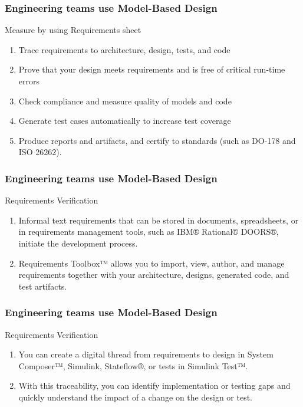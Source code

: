 \newpage 

\begin{frame}
\frametitle{Engineering teams use Model-Based Design }
\begin{block}{ Measure by using Requirements sheet}

\begin{enumerate}
    \item Trace requirements to architecture, design, tests, and code
    \item  Prove that your design meets requirements and is free of critical run-time errors
    \item Check compliance and measure quality of models and code
    \item Generate test cases automatically to increase test coverage
    \item  Produce reports and artifacts, and certify to standards (such as DO-178 and ISO 26262).
\end{enumerate}

\end{block}
\end{frame}


\newpage 

\begin{frame}
\frametitle{Engineering teams use Model-Based Design }
\begin{block}{ Requirements Verification}
\begin{enumerate}
    \item Informal text requirements that can be stored in documents, spreadsheets, or in requirements management tools, such as IBM® Rational® DOORS®, initiate the development process. 
\item  Requirements Toolbox™ allows you to import, view, author, and manage requirements together with your architecture, designs, generated code, and test artifacts. 
\end{enumerate}
\end{block}
\end{frame}


\newpage 

\begin{frame}
\frametitle{Engineering teams use Model-Based Design }
\begin{block}{ Requirements Verification}

\begin{enumerate}
    \item You can create a digital thread from requirements to design in System Composer™, Simulink, Stateflow®, or tests in Simulink Test™. 

 \item  With this traceability, you can identify implementation or testing gaps and quickly understand the impact of a change on the design or test. 
\end{enumerate}

\end{block}
\end{frame}


